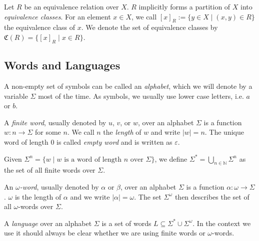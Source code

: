 \begin{defn}
	Let $R$ be an equivalence relation over $X$. $R$ implicitly forms a partition of $X$ into \emph{equivalence classes}. For an element $x \in X$, we call $[x]_R := \{ y \in X \mid (x, y) \in R \}$ the equivalence class of $x$. We denote the set of equivalence classes by $\mathfrak{C}(R) = \{ [x]_R \mid x \in R \}$.
\end{defn}



\subsection{Words and Languages}
\begin{defn}
	A non-empty set of symbols can be called an \emph{alphabet}, which we will denote by a variable $\Sigma$ most of the time. As symbols, we usually use lower case letters, i.e. $a$ or $b$.
	
	A \emph{finite word}, usually denoted by $u$, $v$, or $w$, over an alphabet $\Sigma$ is a function $w : n \rightarrow \Sigma$ for some $n$. We call $n$ the \emph{length} of $w$ and write $|w| = n$. The unique word of length $0$ is called \emph{empty word} and is written as $\varepsilon$.
	
	Given $\Sigma^n = \{ w \mid w \text{ is a word of length } n \text{ over } \Sigma \}$, we define $\Sigma^* = \bigcup\limits_{n \in \mathbb{N}} \Sigma^n$ as the set of all finite words over $\Sigma$. 
\end{defn}

\begin{defn}
	An \emph{$\omega$-word}, usually denoted by $\alpha$ or $\beta$, over an alphabet $\Sigma$ is a function \linebreak $\alpha : \omega \rightarrow \Sigma$. $\omega$ is the length of $\alpha$ and we write $|\alpha| = \omega$. The set $\Sigma^\omega$ then describes the set of all $\omega$-words over $\Sigma$. 
\end{defn}

\begin{defn}
	A \emph{language} over an alphabet $\Sigma$ is a set of words $L \subseteq \Sigma^* \cup \Sigma^\omega$. In the context we use it should always be clear whether we are using finite words or $\omega$-words.
\end{defn}

